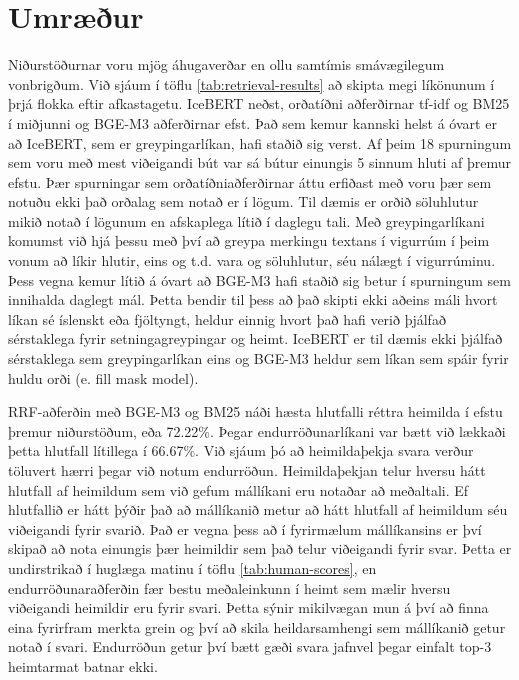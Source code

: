 \documentclass[fleqn]{report}
\begin{document}
\section{Umræður}

Niðurstöðurnar voru mjög áhugaverðar en ollu samtímis smávægilegum vonbrigðum. Við sjáum í töflu \ref{tab:retrieval-results} að skipta megi líkönunum í þrjá flokka eftir afkastagetu. IceBERT \cite{icebert} neðst, orðatíðni aðferðirnar tf-idf \cite{scikit-learn} og BM25 \cite{bm25} í miðjunni og BGE-M3 \cite{bge-m3} aðferðirnar efst. Það sem kemur kannski helst á óvart er að IceBERT, sem er greypingarlíkan, hafi staðið sig verst. Af þeim 18 spurningum sem voru með mest viðeigandi bút var sá bútur einungis 5 sinnum hluti af þremur efstu. Þær spurningar sem orðatíðniaðferðirnar áttu erfiðast með voru þær sem notuðu ekki það orðalag sem notað er í lögum. Til dæmis er orðið söluhlutur mikið notað í lögunum en afskaplega lítið í daglegu tali. Með greypingarlíkani komumst við hjá þessu með því að greypa merkingu textans í vigurrúm í þeim vonum að líkir hlutir, eins og t.d. vara og söluhlutur, séu nálægt í vigurrúminu. Þess vegna kemur lítið á óvart að BGE-M3 hafi staðið sig betur í spurningum sem innihalda daglegt mál. Þetta bendir til þess að það skipti ekki aðeins máli hvort líkan sé íslenskt eða fjöltyngt, heldur einnig hvort það hafi verið þjálfað sérstaklega fyrir setningagreypingar og heimt. IceBERT er til dæmis ekki þjálfað sérstaklega sem greypingarlíkan eins og BGE-M3 heldur sem líkan sem spáir fyrir huldu orði (e. fill mask model).

RRF-aðferðin \cite{rrf} með BGE-M3 \cite{bge-m3} og BM25 \cite{bm25} náði hæsta hlutfalli réttra heimilda í efstu þremur niðurstöðum, eða 72.22\%. Þegar endurröðunarlíkani var bætt við lækkaði þetta hlutfall lítillega í 66.67\%. Við sjáum þó að heimildaþekja svara verður töluvert hærri þegar við notum endurröðun. Heimildaþekjan telur hversu hátt hlutfall af heimildum sem við gefum mállíkani eru notaðar að meðaltali. Ef hlutfallið er hátt þýðir það að mállíkanið metur að hátt hlutfall af heimildum séu viðeigandi fyrir svarið. Það er vegna þess að í fyrirmælum mállíkansins er því skipað að nota einungis þær heimildir sem það telur viðeigandi fyrir svar. Þetta er undirstrikað í huglæga matinu í töflu \ref{tab:human-scores}, en endurröðunaraðferðin fær bestu meðaleinkunn í heimt sem mælir hversu viðeigandi heimildir eru fyrir svari. Þetta sýnir mikilvægan mun á því að finna eina fyrirfram merkta grein og því að skila heildarsamhengi sem mállíkanið getur notað í svari. Endurröðun getur því bætt gæði svara jafnvel þegar einfalt top-3 heimtarmat batnar ekki.
\end{document}
